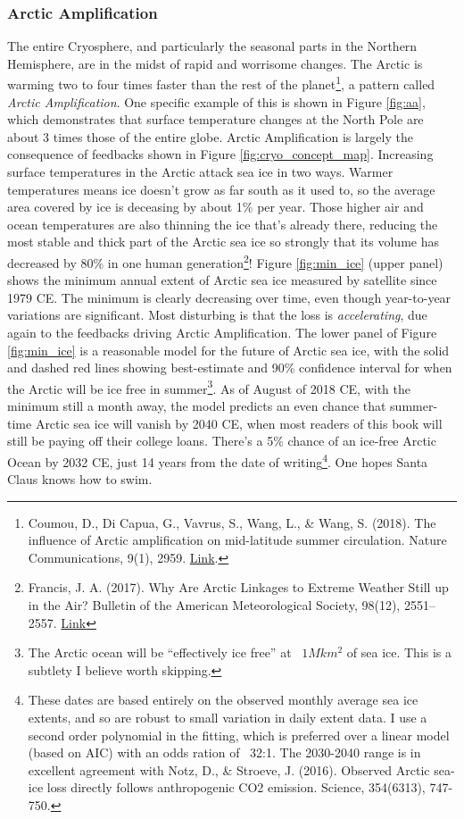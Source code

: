 \documentclass[amstex,12pt]{book}
\begin{document}
\subsubsection{Arctic Amplification}\label{aa} The entire Cryosphere, and particularly the seasonal parts in the Northern Hemisphere, are in the midst of rapid and worrisome changes. The Arctic is warming two to four times faster than the rest of the planet\footnote{Coumou, D., Di Capua, G., Vavrus, S., Wang, L., \& Wang, S. (2018). The influence of Arctic amplification on mid-latitude summer circulation. Nature Communications, 9(1), 2959. \href{https://doi.org/10.1038/s41467-018-05256-8}{Link}.}, a pattern called \emph{Arctic Amplification}. One specific example of this is shown in Figure \ref{fig:aa}, which demonstrates that surface temperature changes at the North Pole are about 3 times those of the entire globe. Arctic Amplification is largely the consequence of feedbacks shown in Figure \ref{fig:cryo_concept_map}. Increasing surface temperatures in the Arctic attack sea ice in two ways. Warmer temperatures means ice doesn't grow as far south as it used to, so the average area covered by ice is deceasing by about 1\% per year. Those higher air and ocean temperatures are also thinning the ice that's already there, reducing the most stable and thick part of the Arctic sea ice so strongly that its volume has decreased by 80\% in one human generation\footnote{Francis, J. A. (2017). Why Are Arctic Linkages to Extreme Weather Still up in the Air? Bulletin of the American Meteorological Society, 98(12), 2551–2557. \href{https://doi.org/10.1175/BAMS-D-17-0006.1}{Link}}! Figure \ref{fig:min_ice} (upper panel) shows the minimum annual extent of Arctic sea ice measured by satellite since 1979 CE. The minimum is clearly decreasing over time, even though year-to-year variations are significant. Most disturbing is that the loss is \emph{accelerating}, due again to the feedbacks driving Arctic Amplification. The lower panel of Figure \ref{fig:min_ice} is a reasonable model for the future of Arctic sea ice, with the solid and dashed red lines showing best-estimate and 90\% confidence interval for when the Arctic will be ice free in summer\footnote{The Arctic ocean will be ``effectively ice free'' at ~$1 Mkm^2$ of sea ice. This is a subtlety I believe worth skipping.}. As of August of 2018 CE, with the minimum still a month away, the model predicts an even chance that summer-time Arctic sea ice will vanish by 2040 CE, when most readers of this book will still be paying off their college loans. There's a 5\% chance of an ice-free Arctic Ocean by 2032 CE, just 14 years from the date of writing\footnote{These dates are based entirely on the observed monthly average sea ice extents, and so are robust to small variation in daily extent data. I use a second order polynomial in the fitting, which is preferred over a linear model (based on AIC) with an odds ration of ~32:1. The 2030-2040 range is in excellent agreement with Notz, D., \& Stroeve, J. (2016). Observed Arctic sea-ice loss directly follows anthropogenic CO2 emission. Science, 354(6313), 747-750.}. One hopes Santa Claus knows how to swim.\\
 
\end{document}
